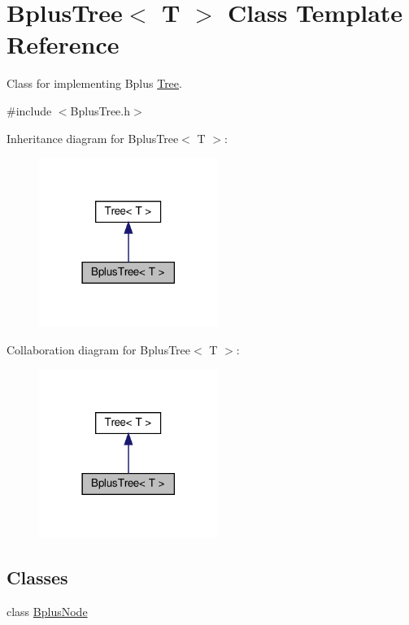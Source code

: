 \hypertarget{classBplusTree}{}\section{Bplus\+Tree$<$ T $>$ Class Template Reference}
\label{classBplusTree}


Class for implementing Bplus \hyperlink{classTree}{Tree}.  




{\ttfamily \#include $<$Bplus\+Tree.\+h$>$}



Inheritance diagram for Bplus\+Tree$<$ T $>$\+:
\nopagebreak
\begin{figure}[H]
\begin{center}
\leavevmode
\includegraphics[width=165pt]{classBplusTree__inherit__graph}
\end{center}
\end{figure}


Collaboration diagram for Bplus\+Tree$<$ T $>$\+:
\nopagebreak
\begin{figure}[H]
\begin{center}
\leavevmode
\includegraphics[width=165pt]{classBplusTree__coll__graph}
\end{center}
\end{figure}
\subsection*{Classes}
\begin{DoxyCompactItemize}
\item 
class \hyperlink{classBplusTree_1_1BplusNode}{Bplus\+Node}
\end{DoxyCompactItemize}
